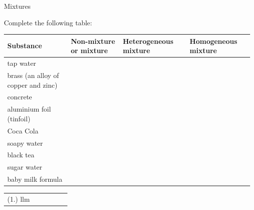 \label{m38708*secfhsst!!!underscore!!!id169}
\begin{exercises}{Mixtures}
{Complete the following table: \\
\begin{tabular}{|l|p{2.5cm}|p{2.5cm}|p{2.5cm}|}\hline
\textbf{Substance} & \textbf{Non-mixture or mixture} & \textbf{Heterogeneous mixture} & \textbf{Homogeneous mixture} \\ \hline
tap water & & & \\ \hline
brass (an alloy of copper and zinc) & & & \\ \hline
concrete & & & \\ \hline
aluminium foil (tinfoil) & & & \\ \hline
Coca Cola & & & \\ \hline
soapy water & & & \\ \hline
black tea & & & \\ \hline
sugar water & & & \\ \hline
baby milk formula & & & \\ \hline
\end{tabular}
\practiceinfo
    \label{m38708*cid3}
\par 
 \par \begin{tabular}[h]{cccccc}
 (1.) llm  & \end{tabular} }
\end{exercises}
